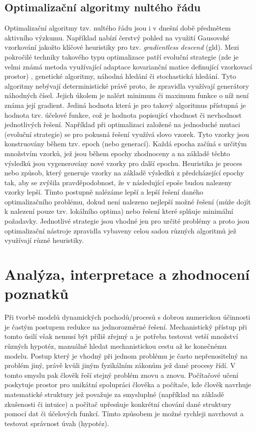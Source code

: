 \section{Optimalizační algoritmy nultého řádu}
\label{sec:opt_alg}
Optimalizační algoritmy tzv. nultého řádu jsou i v dnešní době předmětem
aktivního výzkumu. Například \cite{golovin2019gradientless} nabízí čerstvý
pohled na využití Gausovské vzorkování jakožto klíčové heuristiky pro
tzv. \textit{gradientless descend} (\acrshort{gld}). Mezi pokročilé techniky
takového typu optimalizace patří evoluční strategie (zde je velmi známá metoda
využívající adaptace kovarianční matice definující vzorkovací prostor)
\cite{hansen2016cma}, genetické algoritmy, náhodná hledání či stochastická hledání.
Tyto algoritmy nebývají deterministické právě proto, že zpravidla využívají
generátory náhodných čísel. Jejich úkolem je nalézt minimum či maximum funkce o
níž není známa její gradient. Jediná hodnota která je pro takový algoritmus
přístupná je hodnota tzv. účelové funkce, což je hodnota popisující vhodnost či
nevhodnost jednotlivých řešení. Například při optimalizaci založené na
jednoduché mutaci (evoluční strategie) se pro pokusná řešení využívá slovo
vzorek. Tyto vzorky jsou konstruovány během tzv. epoch (nebo generací). Každá
epocha začíná s určitým množstvím vzorků, jež jsou během epochy zhodnoceny a na
základě těchto výsledků jsou vygenerovány nové vzorky pro další epochu.
Heuristika je proces nebo způsob, který generuje vzorky na základě výsledků z
předcházející epochy tak, aby se zvýšila pravděpodobnost, že v následující
epoše budou nalezeny vzorky lepší. Tímto postupně nalézáme lepší a lepší řešení
daného optimalizačního problému, dokud není nalezeno nejlepší možné řešení
(může dojít k nalezení pouze tzv. lokálního optima) nebo řešení které splňuje
minimální požadavky. Jednotlivé strategie jsou vhodné jen pro určité problémy a
proto jsou optimalizační nástroje zpravidla vybaveny celou sadou různých
algoritmů jež využívají různé heuristiky.

\chapter{Analýza, interpretace a zhodnocení poznatků}
Při tvorbě modelů dynamických pochodů/procesů s dobrou numerickou
účinnosti je častým postupem redukce na jednorozměrné řešení. Mechanistický
přístup při tomto úsilí však nemusí být příliš zřejmý a je potřeba testovat
vetší množství různých hypotéz, manuálně hledat mechanistickou cestu až ke
konečnému modelu. Postup který je vhodný při jednom problému je
často nepřenositelný na problém jiný, právě kvůli jiným fyzikálním zákonům jež
dané procesy řídí. V tomto smyslu pak člověk řeší stejný problém znovu a znovu.
Počítačové učení poskytuje prostor pro unikátní spolupráci člověka a počítače,
kde člověk navrhuje matematické struktury jež považuje za smysluplné (například
na základě zkušenosti či intuice) a počítač upřesňuje konkrétní chování dané
struktury pomocí dat či účelových funkcí. Tímto způsobem je možné rychleji
navrhovat a testovat správnost úvah (hypotéz).

